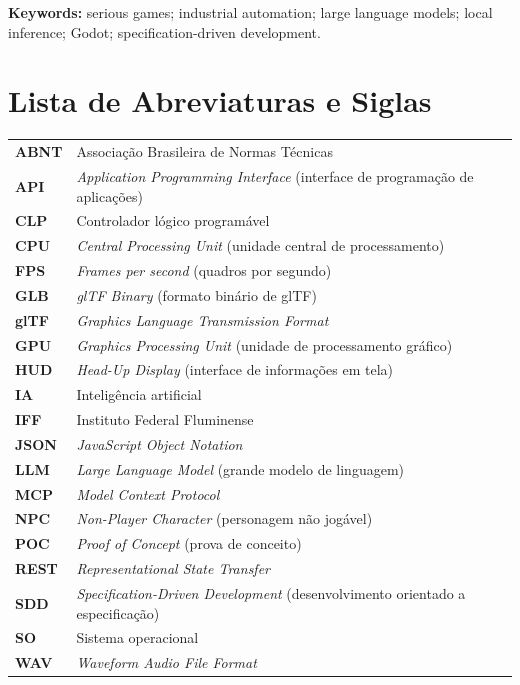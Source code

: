 \vspace{1em}
\noindent\textbf{Keywords:} serious games; industrial automation; large language
models; local inference; Godot; specification-driven development.

\newpage

\SingleSpacing

\listoffigures
\newpage
\listoftables
\newpage
{}
\newpage

\chapter*{Lista de Abreviaturas e Siglas}
\noindent
\begin{tabular}{@{}>{\bfseries}p{2.2cm} p{12.5cm}@{}}
ABNT & Associação Brasileira de Normas Técnicas \\
API & \emph{Application Programming Interface} (interface de programação de aplicações) \\
CLP & Controlador lógico programável \\
CPU & \emph{Central Processing Unit} (unidade central de processamento) \\
FPS & \emph{Frames per second} (quadros por segundo) \\
GLB & \emph{glTF Binary} (formato binário de glTF) \\
glTF & \emph{Graphics Language Transmission Format} \\
GPU & \emph{Graphics Processing Unit} (unidade de processamento gráfico) \\
HUD & \emph{Head-Up Display} (interface de informações em tela) \\
IA & Inteligência artificial \\
IFF & Instituto Federal Fluminense \\
JSON & \emph{JavaScript Object Notation} \\
LLM & \emph{Large Language Model} (grande modelo de linguagem) \\
MCP & \emph{Model Context Protocol} \\
NPC & \emph{Non-Player Character} (personagem não jogável) \\
POC & \emph{Proof of Concept} (prova de conceito) \\
REST & \emph{Representational State Transfer} \\
SDD & \emph{Specification-Driven Development} (desenvolvimento orientado a especificação) \\
SO & Sistema operacional \\
WAV & \emph{Waveform Audio File Format} \\
\end{tabular}

\newpage

\SingleSpacing
\tableofcontents

\cleardoublepage
